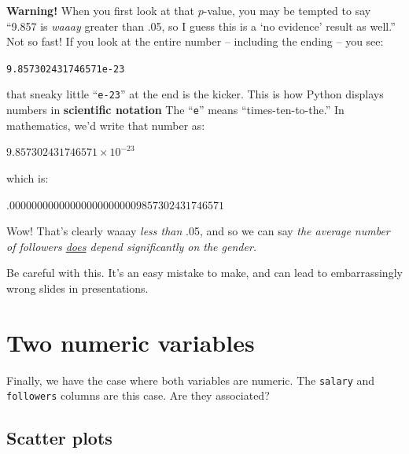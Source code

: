 \textbf{Warning!} When you first look at that $p$-value, you may be tempted to
say ``9.857 is \textit{waaay} greater than .05, so I guess this is a `no
evidence' result as well.'' Not so fast! If you look at the entire number --
including the ending -- you see:

\vspace{-.1in}
\begin{center}
\texttt{9.857302431746571e-23}
\end{center}
\vspace{-.1in}


that sneaky little ``\texttt{e-23}'' at the end is the kicker. This is how
Python displays numbers in \textbf{scientific notation} The
``\texttt{e}'' means ``times-ten-to-the.'' In mathematics, we'd write that
number as:

\vspace{-.2in}
\begin{center}
$9.857302431746571 \times 10^{-23}$
\end{center}
\vspace{-.2in}

which is:

\vspace{-.2in}
\begin{center}
$.000000000000000000000009857302431746571$
\end{center}
\vspace{-.2in}

Wow! That's clearly waaay \textit{less than} .05, and so we can say \textit{the
average number of followers \underline{does} depend significantly on the gender.}

Be careful with this. It's an easy mistake to make, and can lead to
embarrassingly wrong slides in presentations. \smiley


\section{Two numeric variables}

Finally, we have the case where both variables are numeric. The \texttt{salary}
and \texttt{followers} columns are this case. Are they associated?

\subsection{Scatter plots}

